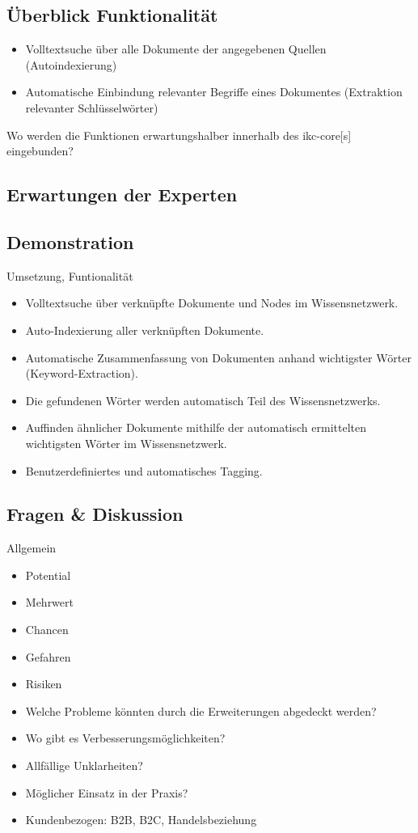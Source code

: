 \subsection{Überblick Funktionalität}

\begin{itemize}
    \item Volltextsuche über alle Dokumente der angegebenen Quellen (Autoindexierung)
    \item Automatische Einbindung relevanter Begriffe eines Dokumentes (Extraktion relevanter Schlüsselwörter)
\end{itemize}

Wo werden die Funktionen erwartungshalber innerhalb des \gls{ikc-core}[s] eingebunden?

\subsection{Erwartungen der Experten}


\subsection{Demonstration}

Umsetzung, Funtionalität

\begin{itemize}
    \item Volltextsuche über verknüpfte Dokumente und Nodes im Wissensnetzwerk.
    \item Auto-Indexierung aller verknüpften Dokumente.
    \item Automatische Zusammenfassung von Dokumenten anhand wichtigster Wörter (Keyword-Extraction).
    \item Die gefundenen Wörter werden automatisch Teil des Wissensnetzwerks.
    \item Auffinden ähnlicher Dokumente mithilfe der automatisch ermittelten wichtigsten Wörter im Wissensnetzwerk.
    \item Benutzerdefiniertes und automatisches Tagging.
\end{itemize}

\subsection{Fragen \& Diskussion}

Allgemein

\begin{itemize}
    \item Potential
    \item Mehrwert
    \item Chancen
    \item Gefahren
    \item Risiken
\end{itemize}


\begin{itemize}
    \item Welche Probleme könnten durch die Erweiterungen abgedeckt werden?
    \item Wo gibt es Verbesserungsmöglichkeiten?
    \item Allfällige Unklarheiten?
    \item Möglicher Einsatz in der Praxis?
    \item Kundenbezogen: B2B, B2C, Handelsbeziehung
\end{itemize}